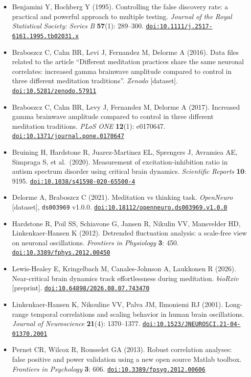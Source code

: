 \documentclass[10pt,a4paper]{article}
\newcommand{\doi}[1]{\href{https://doi.org/#1}{\nolinkurl{doi:#1}}}
\begin{document}
\begin{itemize}[label={}, leftmargin=1.6em, itemindent=-1.6em, itemsep=0.5em]
  \item Benjamini Y, Hochberg Y (1995). Controlling the false discovery rate: a practical and powerful approach to
        multiple testing. \emph{Journal of the Royal Statistical Society: Series B} \textbf{57}(1): 289--300.
        \doi{10.1111/j.2517-6161.1995.tb02031.x}
  \item Braboszcz C, Cahn BR, Levi J, Fernandez M, Delorme A (2016). Data files related to the article ``Different
        meditation practices share the same neuronal correlates: increased gamma brainwave amplitude compared to
        control in three different meditation traditions''. \emph{Zenodo} [dataset]. \doi{10.5281/zenodo.57911}
  \item Braboszcz C, Cahn BR, Levy J, Fernandez M, Delorme A (2017). Increased gamma brainwave amplitude compared to
        control in three different meditation traditions. \emph{PLoS ONE} \textbf{12}(1): e0170647.
        \doi{10.1371/journal.pone.0170647}
  \item Bruining H, Hardstone R, Juarez-Martinez EL, Sprengers J, Avramiea AE, Simpraga S, et al.\ (2020).
        Measurement of excitation-inhibition ratio in autism spectrum disorder using critical brain dynamics.
        \emph{Scientific Reports} \textbf{10}: 9195. \doi{10.1038/s41598-020-65500-4}
  \item Delorme A, Braboszcz C (2021). Meditation vs thinking task. \emph{OpenNeuro} [dataset], \texttt{ds003969}
        v1.0.0. \doi{10.18112/openneuro.ds003969.v1.0.0}
  \item Hardstone R, Poil SS, Schiavone G, Jansen R, Nikulin VV, Mansvelder HD, Linkenkaer-Hansen K (2012).
        Detrended fluctuation analysis: a scale-free view on neuronal oscillations. \emph{Frontiers in Physiology}
        \textbf{3}: 450. \doi{10.3389/fphys.2012.00450}
  \item Lewis-Healey E, Kringelbach M, Canales-Johnson A, Laukkonen R (2026). Near-critical brain dynamics track
        effortlessness during meditation. \emph{bioRxiv} [preprint]. \doi{10.64898/2026.08.07.743470}
  \item Linkenkaer-Hansen K, Nikouline VV, Palva JM, Ilmoniemi RJ (2001). Long-range temporal correlations and
        scaling behavior in human brain oscillations. \emph{Journal of Neuroscience} \textbf{21}(4): 1370--1377.
        \doi{10.1523/JNEUROSCI.21-04-01370.2001}
  \item Pernet CR, Wilcox R, Rousselet GA (2013). Robust correlation analyses: false positive and power validation
        using a new open source Matlab toolbox. \emph{Frontiers in Psychology} \textbf{3}: 606.
        \doi{10.3389/fpsyg.2012.00606}
\end{itemize}
\endgroup
\end{document}
